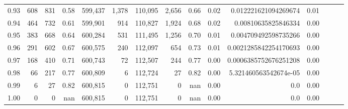 \begin{tabular}{rrrrrrrrrrrrrrr}
0.93 &     608 &    831 &  0.58 &  599,437 &    1,378 &  110,095 &    2,656 &  0.66 &  0.02 &   0.012221621094269674 &      0.01 \\
0.94 &     464 &    732 &  0.61 &  599,901 &      914 &  110,827 &    1,924 &  0.68 &  0.02 &    0.00810635825846334 &      0.00 \\
0.95 &     383 &    668 &  0.64 &  600,284 &      531 &  111,495 &    1,256 &  0.70 &  0.01 &   0.004709492598735266 &      0.00 \\
0.96 &     291 &    602 &  0.67 &  600,575 &      240 &  112,097 &      654 &  0.73 &  0.01 &  0.0021285842254170693 &      0.00 \\
0.97 &     168 &    410 &  0.71 &  600,743 &       72 &  112,507 &      244 &  0.77 &  0.00 &  0.0006385752676251208 &      0.00 \\
0.98 &      66 &    217 &  0.77 &  600,809 &        6 &  112,724 &       27 &  0.82 &  0.00 &  5.321460563542674e-05 &      0.00 \\
0.99 &       6 &     27 &  0.82 &  600,815 &        0 &  112,751 &        0 &   nan &  0.00 &                    0.0 &      0.00 \\
1.00 &       0 &      0 &   nan &  600,815 &        0 &  112,751 &        0 &   nan &  0.00 &                    0.0 &      0.00 \\
\bottomrule
\end{tabular}
